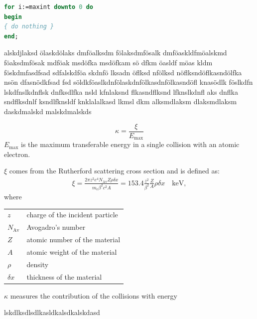 \begin{lstlisting}[float=b,language=Pascal,frame=tb,caption={A floating example (\texttt{listings} manual)},label=lst:useless]
for i:=maxint downto 0 do
begin
{ do nothing }
end;
\end{lstlisting}

alskdjlaksd ölaskdölaks dmföalksdm fölaksdmfösalk  dmföaskldfmöalskmd  föaksdmfösak mdföak msdöfka msdöfkam sö dfkm öasldf möas kldm föskdmfasdfsad
sdfalskdföa skdnfö lksadn öflksd nfölksd   nöflksndöflkasndölfka nsön dfasnödkfsad fsd  
söldkföaslkdnfölaskdnfölkasdnfölkasndöfl  knasödlk  föslkdfn lskdfnslkdnflsk dnfksdlfka nsld kfnlaksnd  flkasndflksnd lfknslkdnfl aks  dnflka sndflksdnlf ksndlfknsldf knklalalkasd  lkmsl dkm alksmdlaksm  dlaksmdlaksm daskdmalskd malskdmalskds

\begin{equation}
\kappa =\frac{\xi}{E_{\textrm{max}}} %
\end{equation}
$E_{\textrm{max}}$ is the maximum transferable energy in a single
collision with an atomic electron.

$\xi$ comes from the Rutherford scattering cross section
and is defined as:
\begin{eqnarray*} \xi  = \frac{2\pi z^2 e^4 N_{\textrm{Av}} Z \rho
\delta x}{m_{\textrm{e}} \beta^2 c^2 A} =  153.4 \frac{z^2}{\beta^2}
\frac{Z}{A}
  \rho \delta x \quad\textrm{keV},
\end{eqnarray*}
where

\begin{tabular}{ll}
$z$          & charge of the incident particle \\
$N_{\textrm{Av}}$     & Avogadro's number \\
$Z$          & atomic number of the material \\
$A$          & atomic weight of the material \\
$\rho$       & density \\
$ \delta x$  & thickness of the material \\
\end{tabular}

$\kappa$ measures the contribution of the collisions with energy

lskdlksdlsdlkasldkalsdkalskdasd





